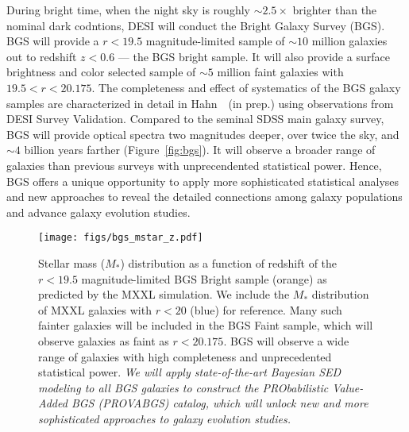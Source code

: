 During bright time, when the night sky is roughly ${\sim}2.5\times$ brighter
than the nominal dark codntions, DESI will conduct the Bright Galaxy Survey
(BGS). 
BGS will provide a $r < 19.5$ magnitude-limited sample of ${\sim}10$ million
galaxies out to redshift $z < 0.6$ --- the BGS bright sample. 
It will also provide a surface brightness and color selected sample of 
${\sim}5$ million faint galaxies with $19.5 < r < 20.175$. 
The completeness and effect of systematics of the BGS galaxy samples are
characterized in detail in Hahn~\etal~(in prep.) using observations from
DESI Survey Validation. 
Compared to the seminal SDSS main galaxy survey, BGS will provide optical
spectra two magnitudes deeper, over twice the sky, and ${\sim}4$ billion years
farther (Figure~\ref{fig:bgs}). 
It will observe a broader range of galaxies than previous surveys with
unprecendented statistical power. 
Hence, BGS offers a unique opportunity to apply more sophisticated statistical
analyses and new approaches to reveal the detailed connections among galaxy
populations and  advance galaxy evolution studies. 

\begin{figure}
\begin{center}
    \texttt{[image: figs/bgs\_mstar\_z.pdf]}
    \caption{
        Stellar mass ($M_*$) distribution as a function of redshift of the $r < 19.5$
        magnitude-limited BGS Bright sample (orange) as predicted by the MXXL
        simulation. 
        We include the $M_*$ distribution of MXXL galaxies with $r < 20$ (blue)
        for reference.
        Many such fainter galaxies will be included in the BGS Faint sample,
        which will observe galaxies as faint as $r < 20.175$. 
        BGS will observe a wide range of galaxies with high completeness and
        unprecedented statistical power.
        \emph{We will apply state-of-the-art Bayesian SED modeling to all BGS
        galaxies to construct the PRObabilistic Value-Added BGS (PROVABGS)
        catalog, which will unlock new and more sophisticated approaches to
        galaxy evolution studies.}}\label{fig:bgs_mstar}
\end{center}
\end{figure}

